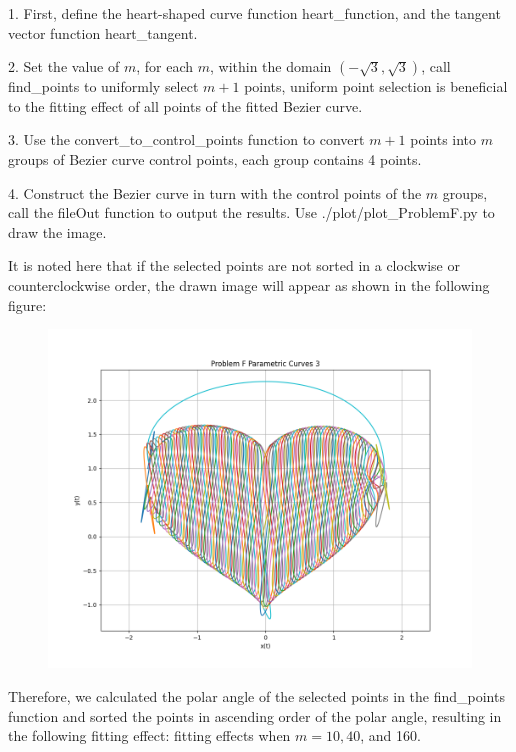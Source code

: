 \documentclass[a4paper]{article}
\begin{document}
1. First, define the heart-shaped curve function heart\_function, and the tangent vector function heart\_tangent.

2. Set the value of \( m \), for each \( m \), within the domain \((-\sqrt{3},\sqrt{3})\), call find\_points to uniformly select \( m+1 \) points, uniform point selection is beneficial to the fitting effect of all points of the fitted Bezier curve.

3. Use the convert\_to\_control\_points function to convert \( m+1 \) points into \( m \) groups of Bezier curve control points, each group contains 4 points.

4. Construct the Bezier curve in turn with the control points of the \( m \) groups, call the fileOut function to output the results. Use ./plot/plot\_ProblemF.py to draw the image.

It is noted here that if the selected points are not sorted in a clockwise or counterclockwise order, the drawn image will appear as shown in the following figure:
\begin{figure}[h]
    \centering
    \includegraphics[width=0.45\linewidth]{Pictures/ProblemF_withoutsort.png}
    \label{fig:enter-label}
\end{figure}

\newpage
Therefore, we calculated the polar angle of the selected points in the find\_points function and sorted the points in ascending order of the polar angle, resulting in the following fitting effect: fitting effects when \( m = 10, 40 \), and 160.
\end{document}
